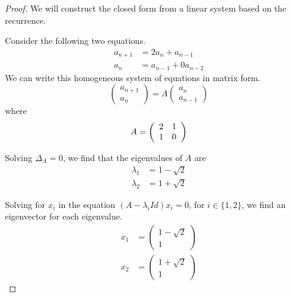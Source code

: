 \documentclass{article}
\begin{document}
\begin{proof}
    We will construct the closed form from a linear system based on the
    recurrence.

    Consider the following two equations.
    \begin{align*}
        a_{n+1} &= 2 a_n + a_{n-1} \\
        a_n &= a_{n-1} + 0 a_{n-2}
    \end{align*}
    We can write this homogeneous system of equations in matrix form.
    \begin{equation*}
        \left(
            \begin{array}{c}
                a_{n+1} \\
                a_n
            \end{array}
        \right)
        =
        A
        \left(
            \begin{array}{c}
                a_n \\
                a_{n-1}
            \end{array}
        \right)
    \end{equation*}
    where
    $$
    A =
    \left(
        \begin{array}{c c}
            2 & 1 \\
            1 & 0
        \end{array}
    \right)
    $$

    Solving $\Delta_A = 0$, we find that the eigenvalues of $A$ are
    \begin{align*}
        \lambda_1 &= 1 - \sqrt{2} \\
        \lambda_2 &= 1 + \sqrt{2}
    \end{align*}

    Solving for $x_i$ in the equation $(A - \lambda_i Id) x_i = 0$, for $i \in
    \{1, 2\}$, we find an eigenvector for each eigenvalue.
    \begin{align*}
        x_1 &=
        \left(
            \begin{array}{c}
                1 - \sqrt{2} \\
                1
            \end{array}
        \right) \\
        x_2 &=
        \left(
            \begin{array}{c}
                1 + \sqrt{2} \\
                1
            \end{array}
        \right)
    \end{align*}


\end{proof}
\end{document}
